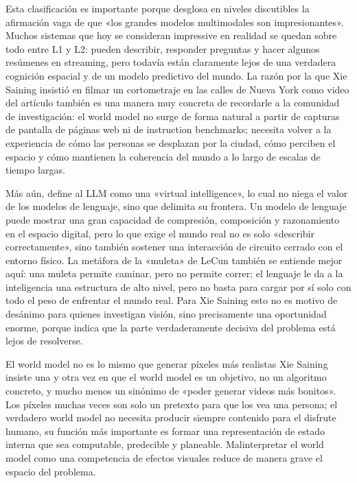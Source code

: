 \documentclass[a4paper,12pt]{article}
\begin{document}
Esta clasificación es importante porque desglosa en niveles discutibles la afirmación vaga de que «los grandes modelos multimodales son impresionantes». Muchos sistemas que hoy se consideran impressive en realidad se quedan sobre todo entre L1 y L2: pueden describir, responder preguntas y hacer algunos resúmenes en streaming, pero todavía están claramente lejos de una verdadera cognición espacial y de un modelo predictivo del mundo. La razón por la que Xie Saining insistió en filmar un cortometraje en las calles de Nueva York como video del artículo también es una manera muy concreta de recordarle a la comunidad de investigación: el world model no surge de forma natural a partir de capturas de pantalla de páginas web ni de instruction benchmarks; necesita volver a la experiencia de cómo las personas se desplazan por la ciudad, cómo perciben el espacio y cómo mantienen la coherencia del mundo a lo largo de escalas de tiempo largas.

Más aún, define al LLM como una «virtual intelligence», lo cual no niega el valor de los modelos de lenguaje, sino que delimita su frontera. Un modelo de lenguaje puede mostrar una gran capacidad de compresión, composición y razonamiento en el espacio digital, pero lo que exige el mundo real no es solo «describir correctamente», sino también sostener una interacción de circuito cerrado con el entorno físico. La metáfora de la «muleta» de LeCun también se entiende mejor aquí: una muleta permite caminar, pero no permite correr; el lenguaje le da a la inteligencia una estructura de alto nivel, pero no basta para cargar por sí solo con todo el peso de enfrentar el mundo real. Para Xie Saining esto no es motivo de desánimo para quienes investigan visión, sino precisamente una oportunidad enorme, porque indica que la parte verdaderamente decisiva del problema está lejos de resolverse.

\begin{warningbox}{El world model no es lo mismo que generar píxeles más realistas}
Xie Saining insiste una y otra vez en que el world model es un objetivo, no un algoritmo concreto, y mucho menos un sinónimo de «poder generar videos más bonitos». Los píxeles muchas veces son solo un pretexto para que los vea una persona; el verdadero world model no necesita producir siempre contenido para el disfrute humano, su función más importante es formar una representación de estado interna que sea computable, predecible y planeable. Malinterpretar el world model como una competencia de efectos visuales reduce de manera grave el espacio del problema.
\end{warningbox}
\end{document}
